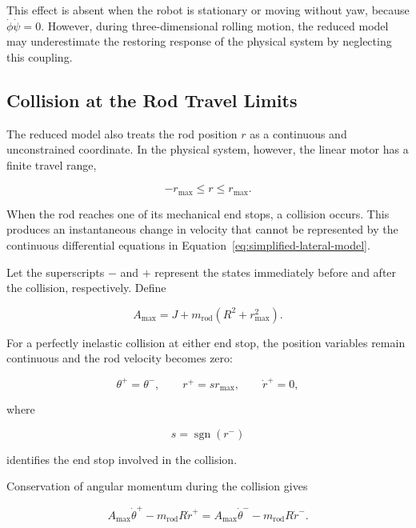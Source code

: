 This effect is absent when the robot is stationary or moving without yaw, because $\dot{\phi}\dot{\psi}=0$. However, during three-dimensional rolling motion, the reduced model may underestimate the restoring response of the physical system by neglecting this coupling.

\subsection{Collision at the Rod Travel Limits}

The reduced model also treats the rod position $r$ as a continuous and unconstrained coordinate. In the physical system, however, the linear motor has a finite travel range,

\begin{equation}
-r_{\max}\leq r\leq r_{\max}.
\label{eq:rod-travel-limit}
\end{equation}

When the rod reaches one of its mechanical end stops, a collision occurs. This produces an instantaneous change in velocity that cannot be represented by the continuous differential equations in Equation~\eqref{eq:simplified-lateral-model}.

Let the superscripts $-$ and $+$ represent the states immediately before and after the collision, respectively. Define

\begin{equation}
A_{\max}
=
J
+
m_{\mathrm{rod}}
\left(
R^2+r_{\max}^2
\right).
\label{eq:collision-inertia}
\end{equation}

For a perfectly inelastic collision at either end stop, the position variables remain continuous and the rod velocity becomes zero:

\begin{equation}
\theta^+=\theta^-,
\qquad
r^+=s r_{\max},
\qquad
\dot{r}^{+}=0,
\label{eq:collision-position-reset}
\end{equation}

where

\begin{equation}
s=\operatorname{sgn}(r^-)
\end{equation}

identifies the end stop involved in the collision.

Conservation of angular momentum during the collision gives

\begin{equation}
A_{\max}\dot{\theta}^{+}
-
m_{\mathrm{rod}}R\dot{r}^{+}
=
A_{\max}\dot{\theta}^{-}
-
m_{\mathrm{rod}}R\dot{r}^{-}.
\label{eq:collision-angular-momentum}
\end{equation}

